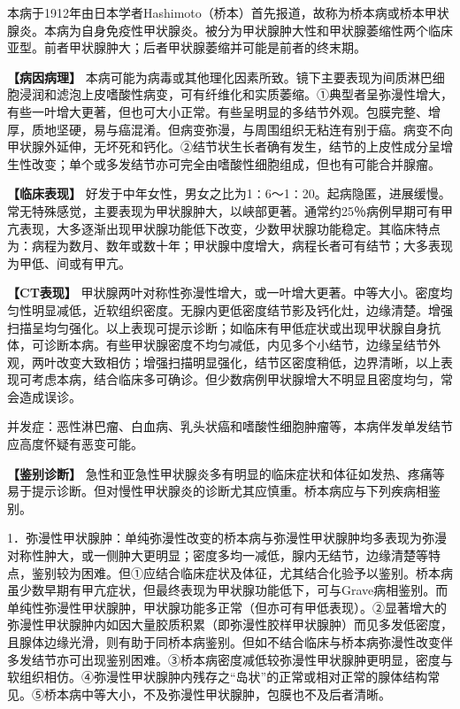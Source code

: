 本病于1912年由日本学者Hashimoto（桥本）首先报道，故称为桥本病或桥本甲状腺炎。本病为自身免疫性甲状腺炎。被分为甲状腺肿大性和甲状腺萎缩性两个临床亚型。前者甲状腺肿大；后者甲状腺萎缩并可能是前者的终末期。

\textbf{【病因病理】}
本病可能为病毒或其他理化因素所致。镜下主要表现为间质淋巴细胞浸润和滤泡上皮嗜酸性病变，可有纤维化和实质萎缩。①典型者呈弥漫性增大，有些一叶增大更著，但也可大小正常。有些呈明显的多结节外观。包膜完整、增厚，质地坚硬，易与癌混淆。但病变弥漫，与周围组织无粘连有别于癌。病变不向甲状腺外延伸，无坏死和钙化。②结节状生长者确有发生，结节的上皮性成分呈增生性改变；单个或多发结节亦可完全由嗜酸性细胞组成，但也有可能合并腺瘤。

\textbf{【临床表现】}
好发于中年女性，男女之比为1∶6～1∶20。起病隐匿，进展缓慢。常无特殊感觉，主要表现为甲状腺肿大，以峡部更著。通常约25％病例早期可有甲亢表现，大多逐渐出现甲状腺功能低下改变，少数甲状腺功能稳定。其临床特点为：病程为数月、数年或数十年；甲状腺中度增大，病程长者可有结节；大多表现为甲低、间或有甲亢。

\textbf{【CT表现】}
甲状腺两叶对称性弥漫性增大，或一叶增大更著。中等大小。密度均匀性明显减低，近软组织密度。无腺内更低密度结节影及钙化灶，边缘清楚。增强扫描呈均匀强化。以上表现可提示诊断；如临床有甲低症状或出现甲状腺自身抗体，可诊断本病。有些甲状腺密度不均匀减低，内见多个小结节，边缘呈结节外观，两叶改变大致相仿；增强扫描明显强化，结节区密度稍低，边界清晰，以上表现可考虑本病，结合临床多可确诊。但少数病例甲状腺增大不明显且密度均匀，常会造成误诊。

并发症：恶性淋巴瘤、白血病、乳头状癌和嗜酸性细胞肿瘤等，本病伴发单发结节应高度怀疑有恶变可能。

\textbf{【鉴别诊断】}
急性和亚急性甲状腺炎多有明显的临床症状和体征如发热、疼痛等易于提示诊断。但对慢性甲状腺炎的诊断尤其应慎重。桥本病应与下列疾病相鉴别。

1．弥漫性甲状腺肿：单纯弥漫性改变的桥本病与弥漫性甲状腺肿均多表现为弥漫对称性肿大，或一侧肿大更明显；密度多均一减低，腺内无结节，边缘清楚等特点，鉴别较为困难。但①应结合临床症状及体征，尤其结合化验予以鉴别。桥本病虽少数早期有甲亢症状，但最终表现为甲状腺功能低下，可与Grave病相鉴别。而单纯性弥漫性甲状腺肿，甲状腺功能多正常（但亦可有甲低表现）。②显著增大的弥漫性甲状腺肿内如因大量胶质积累（即弥漫性胶样甲状腺肿）而见多发低密度，且腺体边缘光滑，则有助于同桥本病鉴别。但如不结合临床与桥本病弥漫性改变伴多发结节亦可出现鉴别困难。③桥本病密度减低较弥漫性甲状腺肿更明显，密度与软组织相仿。④弥漫性甲状腺肿内残存之“岛状”的正常或相对正常的腺体结构常见。⑤桥本病中等大小，不及弥漫性甲状腺肿，包膜也不及后者清晰。

